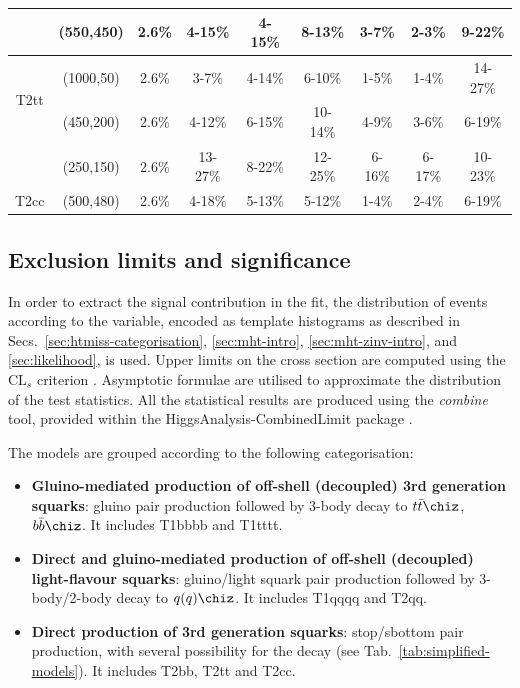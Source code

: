 \begin{table}[h!]
\begin{tabular}{ ccccccccc }
            & (550,450)  & 2.6\% & 4-15\% & 4-15\% & 8-13\% & 3-7\% & 2-3\% & 9-22\%  \\ 
        \hline
        \multirow{2}{*}{T2tt}
            & (1000,50) & 2.6\% & 3-7\%   & 4-14\% & 6-10\%  & 1-5\%  & 1-4\%  & 14-27\% \\
            & (450,200) & 2.6\% & 4-12\%  & 6-15\% & 10-14\% & 4-9\%  & 3-6\%  & 6-19\%  \\
            & (250,150) & 2.6\% & 13-27\% & 8-22\% & 12-25\% & 6-16\% & 6-17\% & 10-23\% \\
        \hline
        \multirow{1}{*}{T2cc}
            & (500,480) & 2.6\% & 4-18\% & 5-13\% & 5-12\% & 1-4\% & 2-4\% & 6-19\% \\
        \hline \hline
    \end{tabular}
\end{table}

\clearpage
\subsection{Exclusion limits and significance}
\label{sec:LLP_results}

In order to extract the signal contribution in the fit, the
distribution of events according to the \mht variable, encoded as
template histograms as described in
Secs.~\ref{sec:htmiss-categorisation}, \ref{sec:mht-intro},
\ref{sec:mht-zinv-intro}, and \ref{sec:likelihood}, is used. Upper
limits on the cross section are computed using the $\text{CL}_{s}$
criterion \cite{CLsTechnique}. Asymptotic formulae
\cite{AsymptoticFormulae} are utilised to approximate the distribution
of the test statistics. All the statistical results are produced using
the \textit{combine} tool, provided within the
HiggsAnalysis-CombinedLimit package \cite{Combine}.

The models are grouped according to the following categorisation:
\begin{itemize}
\item \textbf{Gluino-mediated production of off-shell (decoupled) 3rd
    generation squarks}: gluino pair production followed by 3-body
  decay to $t\bar{t}\chiz$,$b\bar{b}\chiz$.  It includes T1bbbb and
  T1tttt.
\item \textbf{Direct and gluino-mediated production of off-shell
    (decoupled) light-flavour squarks}: gluino/light squark pair
  production followed by 3-body/2-body decay to $q(q)\chiz$. It
  includes T1qqqq and T2qq.
\item \textbf{Direct production of 3rd generation squarks}:
  stop/sbottom pair production, with several possibility for the decay
  (see Tab.~\ref{tab:simplified-models}). It includes T2bb, T2tt and
  T2cc.
\end{itemize}

